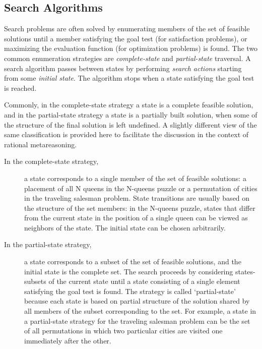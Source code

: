 \subsection{Search Algorithms}

Search problems are often solved by enumerating members of the set of
feasible solutions until a member satisfying the goal test (for
satisfaction problems), or maximizing the evaluation function (for
optimization problems) is found. The two common enumeration strategies
are {\em complete-state} and {\em partial-state} traversal. A search
algorithm passes between states by performing {\em search actions}
starting from some {\em initial state}. The algorithm stops when a
state satisfying the goal test is reached.

Commonly, in the complete-state strategy a state is a complete
feasible solution, and in the partial-state strategy a state is a
partially built solution, when some of the structure of the final
solution is left undefined. A slightly different view of the same
classification is provided here to facilitate the discussion in the
context of rational metareasoning.

\begin{description}
\item[In the complete-state strategy,] a state corresponds to a single
  member of the set of feasible solutions: a  placement
  of all N queens in the N-queens puzzle or a permutation of cities in the
  traveling salesman problem. State transitions are usually based on
  the structure of the set members: in the N-queens puzzle, states
  that differ from the current state in the position of a single queen can
  be viewed as neighbors of the state. The initial state can be
  chosen arbitrarily.

\item[In the partial-state strategy,] a state corresponds to a subset
  of the set of feasible solutions, and the initial state is the
 complete set. The search proceeds by considering states-subsets of
  the current state until a state consisting of a single element
  satisfying the goal test is found. The strategy is called
  `partial-state' because each state is based on partial structure of
  the solution shared by all members of the subset corresponding to
  the set. For example, a state in a partial-state strategy for the
  traveling salesman problem can be the set of all permutations in
  which two particular cities are visited one immediately after the
  other.
\end{description}

